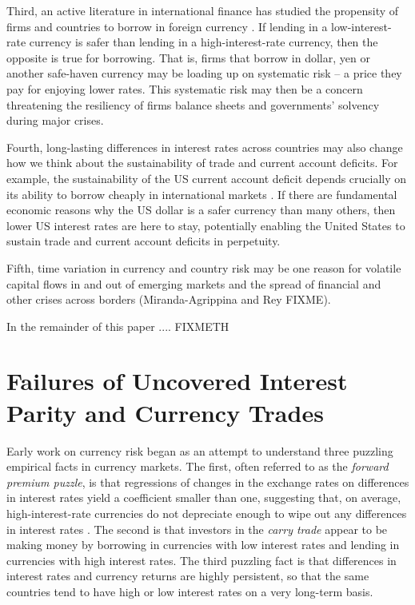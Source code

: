 \documentclass{ar-1col}
\begin{document}
Third, an active literature in international finance has studied the
propensity of firms and countries to borrow in foreign currency
\citep{DuSchreger2016, KalemliOzcanetal2019}. If lending in a
low-interest-rate currency is safer than lending in a
high-interest-rate currency, then the opposite is true for borrowing.
That is, firms that borrow in dollar, yen or another safe-haven
currency may be loading up on systematic risk -- a price they pay for
enjoying lower rates. This systematic risk may then be a concern threatening the resiliency of firms balance sheets and governments' solvency during major crises.

Fourth,
long-lasting differences in interest rates across countries may also
change how we think about the sustainability of trade and current account deficits. For example, the sustainability of the US current account deficit depends crucially on its ability
to borrow cheaply in international markets \citep{GourinchasRey2007}.
If there are fundamental economic reasons why the US dollar is a safer
currency than many others, then lower US interest rates are here to
stay, potentially enabling the United States to sustain trade and
current account deficits in perpetuity.

Fifth, time variation in currency and country risk may be one reason for volatile capital flows in and out of emerging markets and the spread of financial and other crises across borders (Miranda-Agrippina and Rey FIXME).

In the remainder of this paper .... FIXMETH


\section{Failures of
  Uncovered Interest Parity and Currency Trades}

Early work on currency risk began as an attempt to understand three
puzzling empirical facts in currency markets. The first, often referred to as the \textit{forward premium puzzle}, is that
regressions of changes in the exchange rates on differences in
interest rates yield a coefficient smaller than one, suggesting that,
on average, high-interest-rate currencies do not depreciate enough to
wipe out any differences in interest rates \citep{Bilson1981, Fama1984}.
The second is that investors in the \textit{carry trade} appear to be
making money by borrowing in currencies with low interest
rates and lending in currencies with high interest rates. The third puzzling fact is that differences in 
interest rates and currency returns are highly persistent, so that the same
countries tend to have high or low interest rates on a very long-term
basis.
\end{document}
